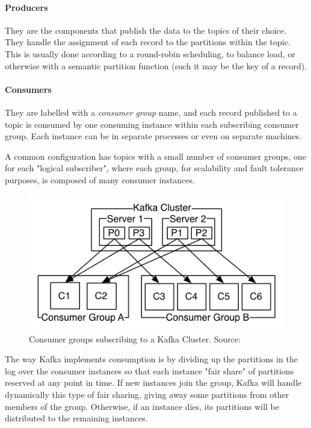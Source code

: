 \paragraph{Producers} They are the components that publish the data to the topics of their choice. They handle the assignment of each record to the partitions within the topic. This is usually done according to a round-robin scheduling, to balance load, or otherwise with a semantic partition function (such it may be the key of a record).

\paragraph{Consumers} They are labelled with a \textit{consumer group} name, and each record published to a topic is consumed by one consuming instance within each subscribing consumer group. Each instance can be in separate processes or even on separate machines.

A common configuration has topics with a small number of consumer groups, one for each "logical subscriber", where each group, for scalability and fault tolerance purposes, is composed of many consumer instances.

\begin{figure}[h]
    \centering
    \includegraphics[width=0.7\linewidth]{Figures/consumer-groups}
    \caption[Consumer groups subscribing to a Kafka Cluster]{Consumer groups subscribing to a Kafka Cluster. Source: \cite{kafka_doc}}
    \label{fig:consumer-groups}
\end{figure}


The way Kafka implements consumption is by dividing up the partitions in the log over the consumer instances so that each instance "fair share" of partitions reserved at any point in time. If new instances join the group, Kafka will handle dynamically this type of fair sharing, giving away some partitions from other members of the group. Otherwise, if an instance dies, its partitions will be distributed to the remaining instances.

